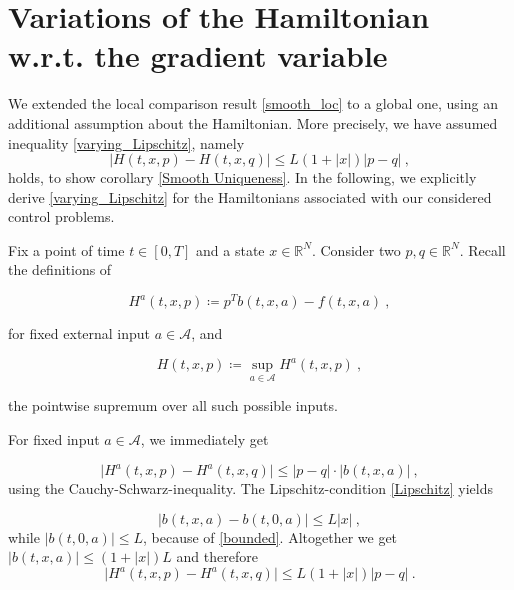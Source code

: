 \section{Variations of the Hamiltonian w.r.t. the gradient variable}
\label{Hamiltonian gradient}

We extended the local comparison result \ref{smooth_loc} to a global one, using an additional assumption about the Hamiltonian. More precisely, we have assumed inequality \eqref{varying_Lipschitz}, namely
\begin{equation*}
	\lvert H(t, x, p) - H(t, x, q) \rvert \leq L \left(1 + \lvert x \rvert \right) \lvert p - q \rvert \ ,
\end{equation*}
holds, to show corollary \ref{Smooth Uniqueness}. In the following, we explicitly derive \eqref{varying_Lipschitz} for the Hamiltonians associated with our considered control problems. 

Fix a point of time $ t \in [0, T] $ and a state $ x \in \mathbb{R}^N $. Consider two  $ p, q \in \mathbb{R}^N $. Recall the definitions of

\begin{equation*}
	H^{a}(t, x, p) \coloneqq p^{T} b(t, x, a) - f(t, x, a) \ ,
\end{equation*} 

for fixed external input $ a \in \mathcal{A} $, and 

\begin{equation*}
	H(t, x, p) \coloneqq \sup\limits_{a \in \mathcal{A}} H^{a}(t, x, p) \ ,
\end{equation*}

the pointwise supremum over all such possible inputs.

For fixed input $ a \in \mathcal{A} $, we immediately get

\begin{equation*}
	\lvert H^{a}(t, x, p) - H^{a}(t, x, q) \lvert \leq \lvert p - q \rvert \cdot \lvert b(t, x, a) \rvert \ ,
\end{equation*}
using the Cauchy-Schwarz-inequality. The Lipschitz-condition \eqref{Lipschitz} yields

\begin{equation*}
	\lvert b(t, x, a) - b(t, 0, a) \rvert \leq L \lvert x \rvert \ ,
\end{equation*}
while $ \lvert b(t, 0, a)  \rvert \leq L $, because of \eqref{bounded}. Altogether we get $ \lvert b(t, x, a) \rvert \leq (1 + \lvert x \rvert) L $ and therefore
\begin{equation}
	\label{index ineq}
	\lvert H^{a}(t, x, p) - H^{a}(t, x, q) \lvert \leq L(1 + \lvert x \rvert) \lvert p - q \rvert \ .
\end{equation}

